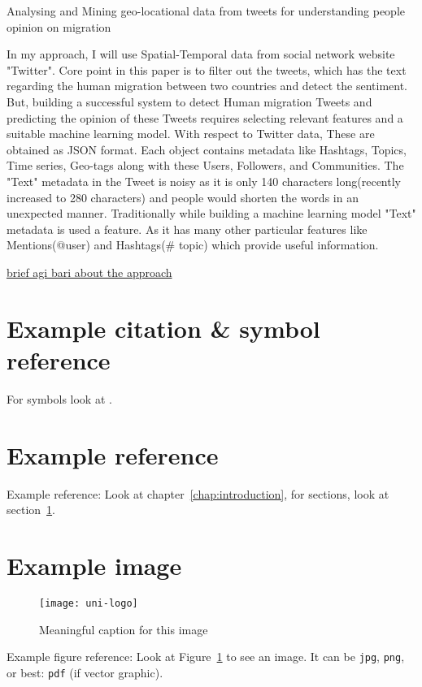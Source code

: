 Analysing and Mining geo-locational data from tweets for understanding people opinion on migration

In my approach, I will use Spatial-Temporal data from social network website "Twitter". Core point in this paper is to filter out the tweets, which has the text regarding the human migration between two countries and detect the sentiment. But, building a successful system to detect Human migration Tweets and predicting the opinion of these Tweets requires selecting relevant features and a suitable machine learning model. With respect to Twitter data, These are obtained as JSON format. Each object contains metadata like Hashtags, Topics, Time series, Geo-tags along with these Users, Followers, and Communities. The "Text" metadata in the Tweet is noisy as it is only 140 characters long(recently increased to 280 characters) and people would shorten the words in an unexpected manner. Traditionally while building a machine learning model "Text" metadata is used a feature. As it has many other particular features like Mentions(@user) and Hashtags(\# topic) which provide useful information.


\underline{brief agi bari about the approach}

\section{Example citation \& symbol reference}\label{sec:citation}
For symbols look at \cite{latex_symbols_2017}.


\section{Example reference}
Example reference: Look at chapter~\ref{chap:introduction}, for sections, look at section~\ref{sec:citation}.

\section{Example image}

\begin{figure}
	\centering
	\texttt{[image: uni-logo]}
	\caption{Meaningful caption for this image}
	\label{fig:uniLogo}
\end{figure}

Example figure reference: Look at Figure~\ref{fig:uniLogo} to see an image. It can be \texttt{jpg}, \texttt{png}, or best: \texttt{pdf} (if vector graphic).

